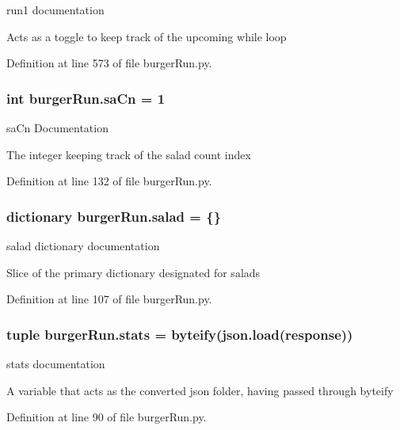 run1 documentation 

Acts as a toggle to keep track of the upcoming while loop 

Definition at line 573 of file burger\-Run.\-py.

\hypertarget{namespaceburgerRun_ad31397d52200426b104cfdec68996e53}{
\subsubsection[{sa\-Cn}]{\setlength{\rightskip}{0pt plus 5cm}int burger\-Run.\-sa\-Cn = 1}}\label{namespaceburgerRun_ad31397d52200426b104cfdec68996e53}


sa\-Cn Documentation 

The integer keeping track of the salad count index 

Definition at line 132 of file burger\-Run.\-py.

\hypertarget{namespaceburgerRun_ae0292c7ef7f5da6a877c2a667f7e397a}{
\subsubsection[{salad}]{\setlength{\rightskip}{0pt plus 5cm}dictionary burger\-Run.\-salad = \{\}}}\label{namespaceburgerRun_ae0292c7ef7f5da6a877c2a667f7e397a}


salad dictionary documentation 

Slice of the primary dictionary designated for salads 

Definition at line 107 of file burger\-Run.\-py.

\hypertarget{namespaceburgerRun_abe1f70c7d10bade5531e0c272dd64c32}{
\subsubsection[{stats}]{\setlength{\rightskip}{0pt plus 5cm}tuple burger\-Run.\-stats = {\bf byteify}(json.\-load({\bf response}))}}\label{namespaceburgerRun_abe1f70c7d10bade5531e0c272dd64c32}


stats documentation 

A variable that acts as the converted json folder, having passed through byteify 

Definition at line 90 of file burger\-Run.\-py.

